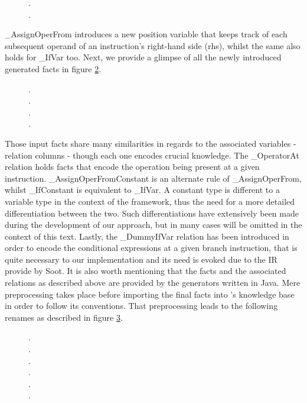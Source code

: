 \begin{figure}[th]
.\\
.
\label{fig:facts-modified}
\end{figure}

\_AssignOperFrom introduces a new position variable that keeps track of
each subsequent operand of an instruction's right-hand side (rhs), whilst
the same also holds for \_IfVar too. Next, we provide a glimpse of all the
newly introduced generated facts in figure \ref{fig:facts-new}.

\begin{figure}[th]
  .\\
  .\\
  .\\
  .
  \label{fig:facts-new}
\end{figure}

Those input facts share many similarities in regards to the associated
variables - relation columns - though each one encodes crucial knowledge.
The \_OperatorAt relation holds facts that encode the operation being present
at a given instruction. \_AssignOperFromConstant is an alternate rule of \_AssignOperFrom,
whilst \_IfConstant is equivalent to \_IfVar. A constant type is different to a variable type
in the context of the framework, thus the need for a more detailed differentiation between the
two. Such differentiations have extensively been made during the development of our approach, but
in many cases will be omitted in the context of this text.
Lastly, the \_DummyIfVar relation has been introduced in order to encode the conditional
expressions at a given branch instruction, that is quite necessary to our implementation
and its need is evoked due to the IR provide by Soot. It is also worth mentioning that
the facts and the associated relations as described above are provided by the generators
written in Java. Mere preprocessing takes place before importing the final facts into \doop{}'s
knowledge base in order to follow its conventions. That preprocessing leads to the following
renames as described in figure \ref{fig:imported-facts}.

\begin{figure}[th]
  .\\
  .\\
  .\\
  .\\
  .\\
  .\\
  \label{fig:imported-facts}
\end{figure}

